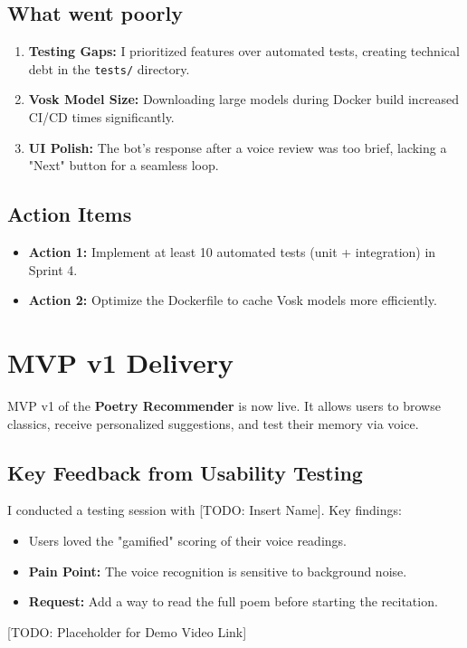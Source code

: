 \documentclass[12pt]{article}
\begin{document}
\subsection{What went poorly}
\begin{enumerate}
    \item \textbf{Testing Gaps:} I prioritized features over automated tests, creating technical debt in the \texttt{tests/} directory.
    \item \textbf{Vosk Model Size:} Downloading large models during Docker build increased CI/CD times significantly.
    \item \textbf{UI Polish:} The bot's response after a voice review was too brief, lacking a "Next" button for a seamless loop.
\end{enumerate}

\subsection{Action Items}
\begin{itemize}
    \item \textbf{Action 1:} Implement at least 10 automated tests (unit + integration) in Sprint 4.
    \item \textbf{Action 2:} Optimize the Dockerfile to cache Vosk models more efficiently.
\end{itemize}

\section{MVP v1 Delivery}

MVP v1 of the \textbf{Poetry Recommender} is now live. It allows users to browse classics, receive personalized suggestions, and test their memory via voice.

\subsection{Key Feedback from Usability Testing}
I conducted a testing session with [TODO: Insert Name]. Key findings:
\begin{itemize}
    \item Users loved the "gamified" scoring of their voice readings.
    \item \textbf{Pain Point:} The voice recognition is sensitive to background noise.
    \item \textbf{Request:} Add a way to read the full poem before starting the recitation.
\end{itemize}

[TODO: Placeholder for Demo Video Link] \\
[TODO: Placeholder for Customer Recording Link]
\end{document}
